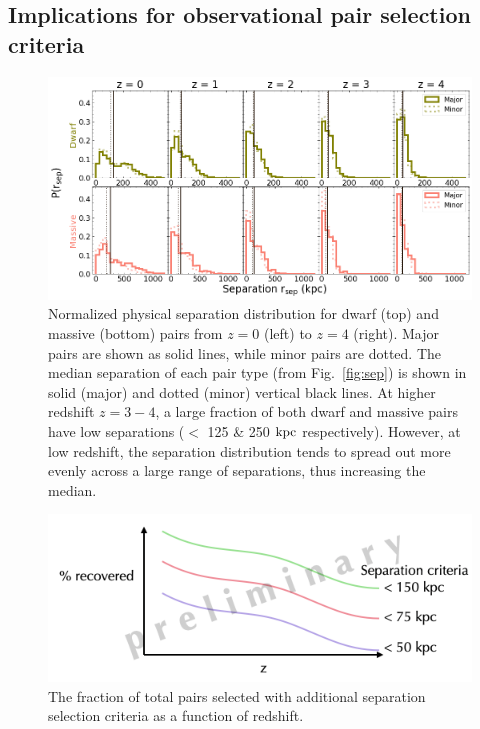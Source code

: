 \documentclass[twocolumn]{aastex631}
\begin{document}
\subsection{Implications for observational pair selection criteria}
    \begin{figure}[htp]
      \centering
      \includegraphics[width=\textwidth]{sepdist_1000.png}
      \caption{Normalized physical separation distribution for dwarf (top) and massive (bottom) pairs from $z=0$ (left) to $z=4$ (right). Major pairs are shown as solid lines, while minor pairs are dotted. The median separation of each pair type (from Fig.~\ref{fig:sep}) is shown in solid (major) and dotted (minor) vertical black lines. 
      At higher redshift $z=3-4$, a large fraction of both dwarf and massive pairs have low separations ($<$ 125 \& 250 $\mathrm{kpc}$ respectively). However, at low redshift, the separation distribution tends to spread out more evenly across a large range of separations, thus increasing the median.
        }
      \label{fig:sep-dist}
    \end{figure}
    \begin{figure}[htp]
      \centering
      \includegraphics[width=\textwidth]{frac_selected.png}
      \caption{ The fraction of total pairs selected with additional separation selection criteria as a function of redshift. 
        }
      \label{fig:frac-select}
    \end{figure}
\end{document}
